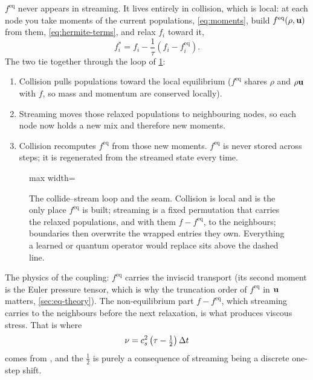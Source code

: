 $f^{\mathrm{eq}}$ never appears in streaming. It lives entirely in collision, which is
local: at each node you take moments of the current populations, \cref{eq:moments}, build
$f^{\mathrm{eq}}(\rho, \mathbf{u})$ from them, \cref{eq:hermite-terms}, and relax $f_i$ toward it,
\begin{equation}
f_i^{*} = f_i - \frac{1}{\tau}\left(f_i - f_i^{\mathrm{eq}}\right).
\label{eq:bgk-relax}
\end{equation}
The two tie together through the loop of \cref{fig:loop}:
\begin{enumerate}[nosep]
\item Collision pulls populations toward the local equilibrium ($f^{\mathrm{eq}}$ shares
      $\rho$ and $\rho\mathbf{u}$ with $f$, so mass and momentum are conserved locally).
\item Streaming moves those relaxed populations to neighbouring nodes, so each node now
      holds a new mix and therefore new moments.
\item Collision recomputes $f^{\mathrm{eq}}$ from those new moments. $f^{\mathrm{eq}}$ is
      never stored across steps; it is regenerated from the streamed state every time.
\end{enumerate}

\begin{figure}[h]
\centering
\begin{adjustbox}{max width=\linewidth}\end{adjustbox}
\caption{The collide--stream loop and the seam. Collision is local and is the only place
$f^{\mathrm{eq}}$ is built; streaming is a fixed permutation that carries the relaxed
populations, and with them $f - f^{\mathrm{eq}}$, to the neighbours; boundaries then
overwrite the wrapped entries they own. Everything a learned or quantum operator would
replace sits above the dashed line.}
\label{fig:loop}
\end{figure}

The physics of the coupling: $f^{\mathrm{eq}}$ carries the inviscid transport (its second
moment is the Euler pressure tensor, which is why the truncation order of $f^{\mathrm{eq}}$
in $\mathbf{u}$ matters, \cref{sec:eq-theory}). The non-equilibrium part $f - f^{\mathrm{eq}}$,
which streaming carries to the neighbours before the next relaxation, is what produces
viscous stress. That is where
\begin{equation}
\nu = c_s^2\left(\tau - \tfrac{1}{2}\right)\Delta t
\label{eq:viscosity}
\end{equation}
comes from \parencite{Kruger2017}, and the $\tfrac{1}{2}$ is purely a consequence of
streaming being a discrete one-step shift.


